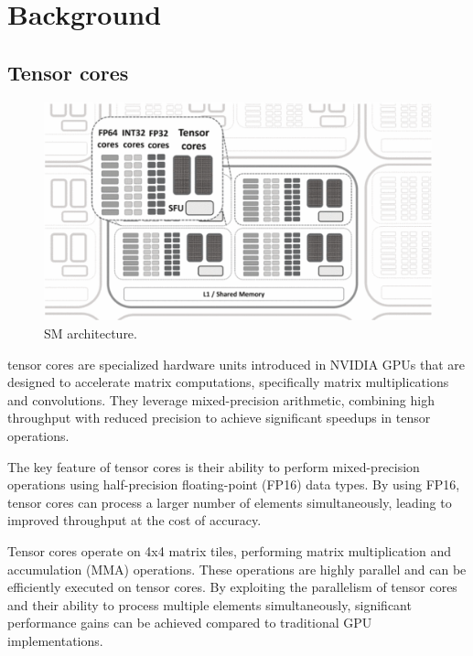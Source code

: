\documentclass[conference]{IEEEtran}
\begin{document}
  \section{Background}\label{sec:background}
  
  \subsection{Tensor cores}\label{sec:tensor-cores}
  \begin{figure}[htbp]
    \centering
    \includegraphics[scale=0.32]{figures/SM.png}
    \caption{SM architecture.\cite{NVIDIA_Tensor_Core_Programmability_KTH}}
    \label{fig:performance-comparison}
  \end{figure}

  tensor cores are specialized hardware units introduced in NVIDIA GPUs that are designed to accelerate matrix computations, 
  specifically matrix multiplications and convolutions. They leverage mixed-precision arithmetic, 
  combining high throughput with reduced precision to achieve significant speedups in tensor operations.
  
  The key feature of tensor cores is their ability to perform mixed-precision operations using 
  half-precision floating-point (FP16) data types. By using FP16, tensor cores can process a larger 
  number of elements simultaneously, leading to improved throughput at the cost of accuracy.\cite{precision_FMA} 
  
  Tensor cores operate on 4x4 matrix tiles, performing matrix multiplication and accumulation (MMA) 
  operations. These operations are highly parallel and can be efficiently executed on tensor cores. 
  By exploiting the parallelism of tensor cores and their ability to process multiple elements 
  simultaneously, significant performance gains can be achieved compared to traditional GPU 
  implementations.
\end{document}
